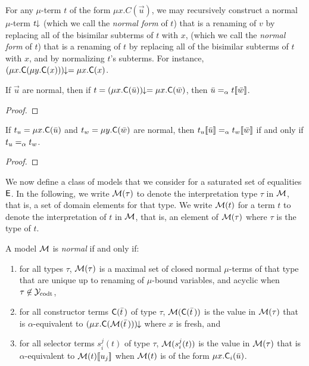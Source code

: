 For any $\mu$-term $t$ of the form $\mu x. C( \vec u )$, we may recursively construct a normal $\mu$-term ${t}\!\!\downarrow$
(which we call the \emph{normal form} of $t$)
that is a renaming of $v$ by replacing all of the bisimilar subterms of $t$ with $x$,
(which we call the \emph{normal form} of $t$)
that is a renaming of $t$ by replacing all of the bisimilar subterms of $t$ with $x$,
and by normalizing $t$'s subterms.
For instance, ${(\mu x. \textsf{C}( \mu y. \textsf{C}( x ) ))}\!\!\downarrow = \mu x. \textsf{C}( x )$.

\begin{lemma}
\label{lem:mu-norm-arg}
If $\vec u$ are normal, then if $t = {(\mu x. \textsf{C}( \bar u ) )}\!\!\downarrow = \mu x. \textsf{C}( \bar w )$,
then $\bar u \mathrel{=_\alpha} t[\![ \bar w ]\!]$.
\end{lemma}
\begin{proof}
\end{proof}

\begin{lemma}
\label{lem:mu-cong}
If $t_u = \mu x. \textsf{C}( \bar u )$ and $t_w = \mu y. \textsf{C}( \bar w )$ are normal,
then $t_u[\![  \bar u  ]\!] \mathrel{=_\alpha} t_w[\![  \bar w  ]\!]$ if and only if $t_u \mathrel{=_\alpha} t_w$.
\end{lemma}
\begin{proof}
\end{proof}

We now define a class of models that we consider for a saturated set of equalities $\mathsf{E}$.
In the following, we write $\mathcal{M}( \tau )$ to denote the interpretation type $\tau$ in $\mathcal{M}$,
that is, a set of domain elements for that type.
We write $\mathcal{M}( t )$ for a term $t$ to denote the interpretation of $t$ in $\mathcal{M}$,
that is, an element of $\mathcal{M}( \tau )$ where $\tau$ is the type of $t$.

\begin{definition} \label{def:norm-model}
A model $\mathcal{M}$ is \emph{normal} if and only if:
\begin{enumerate}
\item
for all types $\tau$,
$\mathcal{M}( \tau )$ is a maximal set of closed normal $\mu$-terms of that type that are
unique up to renaming of $\mu$-bound variables,
and acyclic when $\tau \not\in \mathcal{Y}_{\mathrm{codt}}$,
\item
for all constructor terms $\textsf{C}( \bar t \,)$ of type $\tau$,
$\mathcal{M}( \textsf{C}( \bar t \,) )$ is the value
in $\mathcal{M}( \tau )$ that is $\alpha$-equivalent to
${(\mu x. \textsf{C}( \mathcal{M}( \bar t \,) ))}\!\!\downarrow$ where $x$ is fresh, and
\item
for all selector terms $s^j_i( t )$ of type $\tau$,%
$\mathcal{M}( s^j_i( t ) )$ is the value
in $\mathcal{M}( \tau )$ that is $\alpha$-equivalent to
$\mathcal{M}( t )[\![ u_j ]\!]$
when $\mathcal{M}( t )$ is of the form $\mu x. \textsf{C}_i( \bar u )$.
\end{enumerate}
\end{definition}

